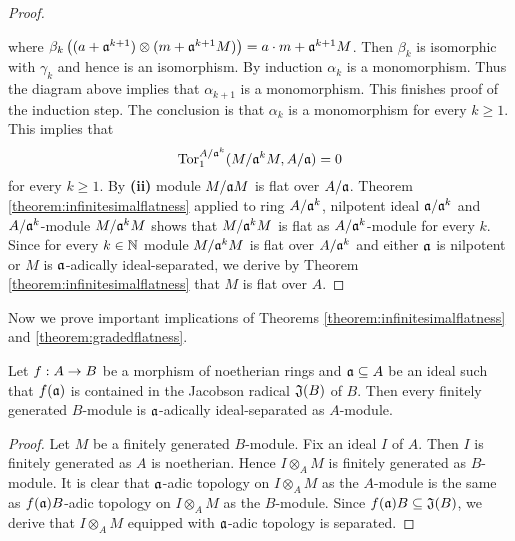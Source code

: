 \begin{proof}
\begin{center}
\end{center}
where $\beta_{k}\left((a+\mathfrak{a}^{k+1})\otimes (m+\mathfrak{a}^{k+1}M)\right) = a\cdot m+\mathfrak{a}^{k+1}M$. Then $\beta_{k}$ is isomorphic with $\gamma_{k}$ and hence is an isomorphism. By induction $\alpha_k$ is a monomorphism. Thus the diagram above implies that $\alpha_{k+1}$ is a monomorphism. This finishes proof of the induction step. The conclusion is that $\alpha_k$ is a monomorphism for every $k\geq 1$. This implies that 
$$\mathrm{Tor}^{A/\mathfrak{a}^k}_1(M/\mathfrak{a}^kM,A/\mathfrak{a})=0$$
for every $k\geq 1$. By \textbf{(ii)} module $M/\mathfrak{a}M$ is flat over $A/\mathfrak{a}$. Theorem \ref{theorem:infinitesimalflatness} applied to ring $A/\mathfrak{a}^k$, nilpotent ideal $\mathfrak{a}/\mathfrak{a}^k$ and $A/\mathfrak{a}^k$-module $M/\mathfrak{a}^kM$ shows that $M/\mathfrak{a}^kM$ is flat as $A/\mathfrak{a}^k$-module for every $k$. Since for every $k\in {\mathbb N}$ module $M/\mathfrak{a}^kM$ is flat over $A/\mathfrak{a}^k$ and either $\mathfrak{a}$ is nilpotent or $M$ is $\mathfrak{a}$-adically ideal-separated, we derive by Theorem \ref{theorem:infinitesimalflatness} that $M$ is flat over $A$.
\end{proof}
\noindent
Now we prove important implications of Theorems \ref{theorem:infinitesimalflatness} and \ref{theorem:gradedflatness}.

\begin{fact}\label{fact:criterionforideal-separated}
Let $f:A\rightarrow B$ be a morphism of noetherian rings and $\mathfrak{a}\subseteq A$ be an ideal such that $f(\mathfrak{a})$ is contained in the Jacobson radical $\mathfrak{J}(B)$ of $B$. Then every finitely generated $B$-module is $\mathfrak{a}$-adically ideal-separated as $A$-module.
\end{fact}
\begin{proof}
Let $M$ be a finitely generated $B$-module. Fix an ideal $I$ of $A$. Then $I$ is finitely generated as $A$ is noetherian. Hence $I\otimes_AM$ is finitely generated as $B$-module. It is clear that $\mathfrak{a}$-adic topology on $I\otimes_AM$ as the $A$-module is the same as $f(\mathfrak{a})B$-adic topology on $I\otimes_AM$ as the $B$-module. Since $f(\mathfrak{a})B\subseteq \mathfrak{J}(B)$, we derive that $I\otimes_AM$ equipped with $\mathfrak{a}$-adic topology is separated.
\end{proof}

